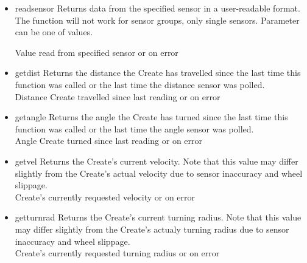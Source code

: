\documentclass {article}
\begin{document}
\begin {itemize}
  \item {} {readsensor}
        Returns data from the specified sensor in a user-readable format.  The function will not
        work for sensor groups, only single sensors.  Parameter can be one of \oisensor values. \\
        \ret Value read from specified sensor or \fail on error

  \item {} {getdist}
        Returns the distance the Create has travelled since the last time this function was called
        or the last time the distance sensor was polled. \\
        \ret Distance Create travelled since last reading or \fail on error

  \item {} {getangle}
        Returns the angle the Create has turned since the last time this function was called or the
        last time the angle sensor was polled. \\
        \ret Angle Create turned since last reading or \fail on error

  \item {} {getvel}
        Returns the Create's current velocity.  Note that this value may differ slightly from the
        Create's actual velocity due to sensor inaccuracy and wheel slippage. \\
        \ret Create's currently requested velocity or \fail on error

  \item {} {getturnrad}
        Returns the Create's current turning radius.  Note that this value may differ slightly from
        the Create's actualy turning radius due to sensor inaccuracy and wheel slippage. \\
        \ret Create's currently requested turning radius or \fail on error


\end{itemize}
\end{document}
